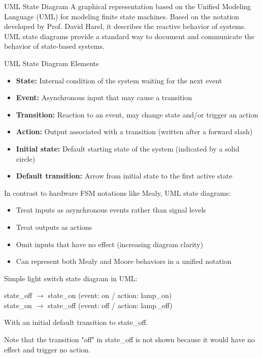 \begin{definition}{UML State Diagram}
A graphical representation based on the Unified Modeling Language (UML) for modeling finite state machines. Based on the notation developed by Prof. David Harel, it describes the reactive behavior of systems. UML state diagrams provide a standard way to document and communicate the behavior of state-based systems.
\end{definition}

\begin{concept}{UML State Diagram Elements}
\begin{itemize}
    \item \textbf{State:} Internal condition of the system waiting for the next event
    \item \textbf{Event:} Asynchronous input that may cause a transition
    \item \textbf{Transition:} Reaction to an event, may change state and/or trigger an action
    \item \textbf{Action:} Output associated with a transition (written after a forward slash)
    \item \textbf{Initial state:} Default starting state of the system (indicated by a solid circle)
    \item \textbf{Default transition:} Arrow from initial state to the first active state
\end{itemize}

In contrast to hardware FSM notations like Mealy, UML state diagrams:
\begin{itemize}
    \item Treat inputs as asynchronous events rather than signal levels
    \item Treat outputs as actions
    \item Omit inputs that have no effect (increasing diagram clarity)
    \item Can represent both Mealy and Moore behaviors in a unified notation
\end{itemize}
\end{concept}

\begin{example}
Simple light switch state diagram in UML:

\begin{center}
state\_off $\rightarrow$ state\_on (event: on / action: lamp\_on)\\
state\_on $\rightarrow$ state\_off (event: off / action: lamp\_off)
\end{center}

With an initial default transition to state\_off.

Note that the transition "off" in state\_off is not shown because it would have no effect and trigger no action.
\end{example}

